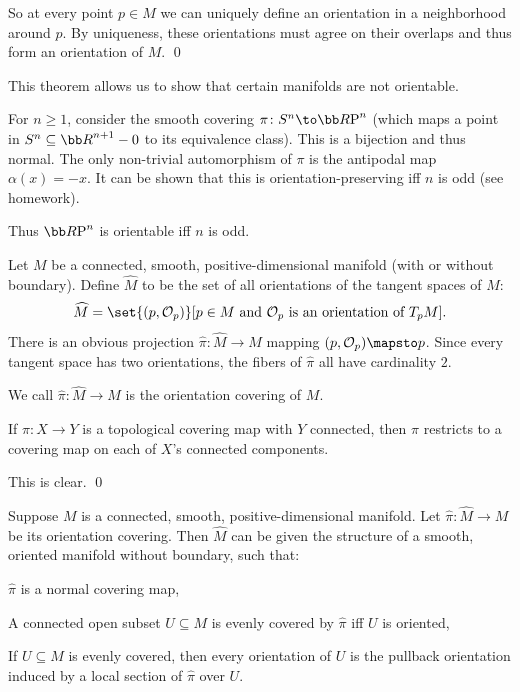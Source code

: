     So at every point $p\in M$ we can uniquely define an orientation in a neighborhood around $p$.
    By uniqueness, these orientations must agree on their overlaps and thus form an orientation of $M$.
    \qed

\eproof

This theorem allows us to show that certain manifolds are not orientable.

\bexam

    For $n\geq1$, consider the smooth covering $\pi\colon S^n\to\RP^n$ (which maps a point in $S^n\subseteq\bR^{n+1}-0$
    to its equivalence class).
    This is a bijection and thus normal.
    The only non-trivial automorphism of $\pi$ is the antipodal map $\alpha(x)=-x$.
    It can be shown that this is orientation-preserving iff $n$ is odd (see homework).

    Thus $\RP^n$ is orientable iff $n$ is odd.

\eexam

\bdefn

    Let $M$ be a connected, smooth, positive-dimensional manifold (with or without boundary).
    Define $\hat M$ to be the set of all orientations of the tangent spaces of $M$:
    $$ \hat M = \set{(p,\O_p)}[\hbox{$p\in M$ and $\O_p$ is an orientation of $T_pM$}] . $$
    There is an obvious projection $\hat\pi\colon\hat M\to M$ mapping $(p,\O_p)\mapsto p$.
    Since every tangent space has two orientations, the fibers of $\hat\pi$ all have cardinality $2$.

    We call $\hat\pi\colon\hat M\to M$ is the {\emphcolor orientation covering} of $M$.

\edefn

\blemm

    If $\pi\colon X\to Y$ is a topological covering map with $Y$ connected, then $\pi$ restricts to a covering map
    on each of $X$'s connected components.

\elemm

\bproof

    This is clear.
    \qed

\eproof

\bprop

    Suppose $M$ is a connected, smooth, positive-dimensional manifold.
    Let $\hat\pi\colon\hat M\to M$ be its orientation covering.
    Then $\hat M$ can be given the structure of a smooth, oriented manifold without boundary, such that:
    \benum
        \item $\hat\pi$ is a normal covering map,
        \item A connected open subset $U\subseteq M$ is evenly covered by $\hat\pi$ iff $U$ is oriented,
        \item If $U\subseteq M$ is evenly covered, then every orientation of $U$ is the pullback orientation induced
        by a local section of $\hat\pi$ over $U$.
    \eenum

